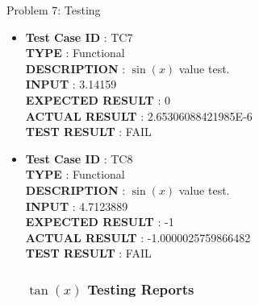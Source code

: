 \documentclass[a4paper,12pt]{article}
\begin{document}
\begin{section}{Problem 7: Testing}
\begin{itemize}
\item \textbf{Test Case ID} \hspace{1.85cm} : TC7  \\
\textbf{TYPE } \hspace{3.05cm}  : Functional\\
\textbf{DESCRIPTION }\hspace{1.15cm} : $\sin(x)$ value test. \\
\textbf{INPUT} \hspace{3.05cm} :  3.14159 \\
\textbf{EXPECTED RESULT} \hspace{0.01cm} : 0 \\
\textbf{ACTUAL RESULT} \hspace{0.6cm} : 2.65306088421985E-6 \\
\textbf{TEST RESULT} \hspace{1.45cm} : FAIL \\


\item \textbf{Test Case ID} \hspace{1.85cm} : TC8  \\
\textbf{TYPE } \hspace{3.05cm}  : Functional\\
\textbf{DESCRIPTION }\hspace{1.15cm} : $\sin(x)$ value test. \\
\textbf{INPUT} \hspace{3.05cm} :  4.7123889 \\
\textbf{EXPECTED RESULT} \hspace{0.01cm} : -1 \\
\textbf{ACTUAL RESULT} \hspace{0.6cm} : -1.0000025759866482 \\
\textbf{TEST RESULT} \hspace{1.45cm} : FAIL \\


\subsubsection{$\tan(x)$ Testing Reports}


\end{itemize}
\end{section}
\end{document}
